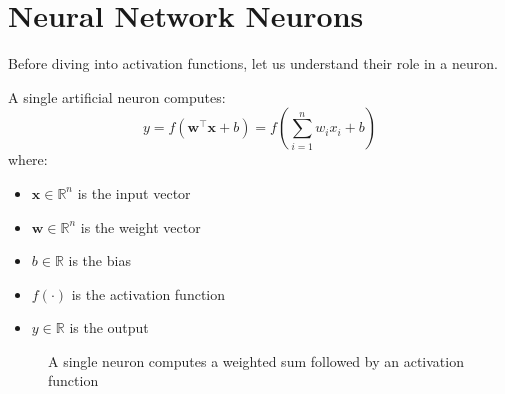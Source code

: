\section{Neural Network Neurons}

Before diving into activation functions, let us understand their role in a neuron.

A single artificial neuron computes:
\begin{equation}
y = f(\mathbf{w}^\top \mathbf{x} + b) = f\left(\sum_{i=1}^{n} w_i x_i + b\right)
\end{equation}
where:
\begin{itemize}
    \item $\mathbf{x} \in \mathbb{R}^n$ is the input vector
    \item $\mathbf{w} \in \mathbb{R}^n$ is the weight vector
    \item $b \in \mathbb{R}$ is the bias
    \item $f(\cdot)$ is the activation function
    \item $y \in \mathbb{R}$ is the output
\end{itemize}

\begin{figure}[htbp]
    \centering
    \caption[Singe neuron computation]{A single neuron computes a weighted sum followed by an activation function}
    \label{fig:neuron}
\end{figure}

